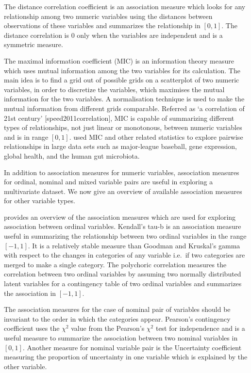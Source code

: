 The distance correlation coefficient \citep{szekely2007measuring} is an
association measure which looks for any relationship among two numeric
variables using the distances between observations of these variables
and summarizes the relationship in \([0,1]\). The distance correlation
is \(0\) only when the variables are independent and is a symmetric
measure.

The maximal information coefficient (MIC) \citep{reshef2011detecting} is
an information theory measure which uses mutual information among the
two variables for its calculation. The main idea is to find a grid out
of possible grids on a scatterplot of two numeric variables, in order to
discretize the variables, which maximises the mutual information for the
two variables. A normalisation technique is used to make the mutual
information from different grids comparable. Referred as `a correlation
of 21st century' {[}speed2011correlation{]}, MIC is capable of
summarizing different types of relationships, not just linear or
monotonous, between numeric variables and is in range \([0,1]\).
\citet{reshef2011detecting} used MIC and other related statistics to
explore pairwise relationships in large data sets such as major-league
baseball, gene expression, global health, and the human gut microbiota.

In addition to association measures for numeric variables, association
measures for ordinal, nominal and mixed variable pairs are useful in
exploring a multivariate dataset. We now give an overview of available
association measures for other variable types.

\citet{agresti2010analysis} provides an overview of the association
measures which are used for exploring association between ordinal
variables. Kendall's tau-b \citep{kendall1945treatment} is an
association measure useful in summarizing the relationship between two
ordinal variables in the range \([-1,1]\). It is a relatively stable
measure than Goodman and Kruskal's gamma with respect to the changes in
categories of any variable i.e.~if two categories are merged to make a
single category. The polychoric correlation \citep{olsson1979maximum}
measures the correlation between two ordinal variables by assuming two
normally distributed latent variables for a contingency table of two
ordinal variables and summarizes the association in \([-1,1]\).

The association measures for the case of nominal pair of variables
should be invariant to the order in which the categories appear.
Pearson's contingency coefficient uses the \({\chi}^2\) value from the
Pearson's \({\chi}^2\) test for independence and is a useful measure to
summarize the association between two nominal variables in \([0,1]\).
Another measure for nominal variable pair is the Uncertainty coefficient
\citep{theil1970estimation} measuring the proportion of uncertainty in
one variable which is explained by the other variable.

